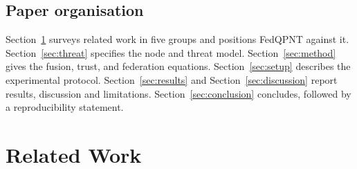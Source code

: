\documentclass[journal]{IEEEtran}
\begin{document}
\subsection{Paper organisation}
Section~\ref{sec:related} surveys related work in five groups and positions FedQPNT against it.
Section~\ref{sec:threat} specifies the node and threat model. Section~\ref{sec:method} gives the
fusion, trust, and federation equations. Section~\ref{sec:setup} describes the experimental protocol.
Section~\ref{sec:results} and Section~\ref{sec:discussion} report results, discussion and limitations. Section~\ref{sec:conclusion} concludes, followed by a reproducibility statement.

\section{Related Work}
\label{sec:related}
\end{document}
